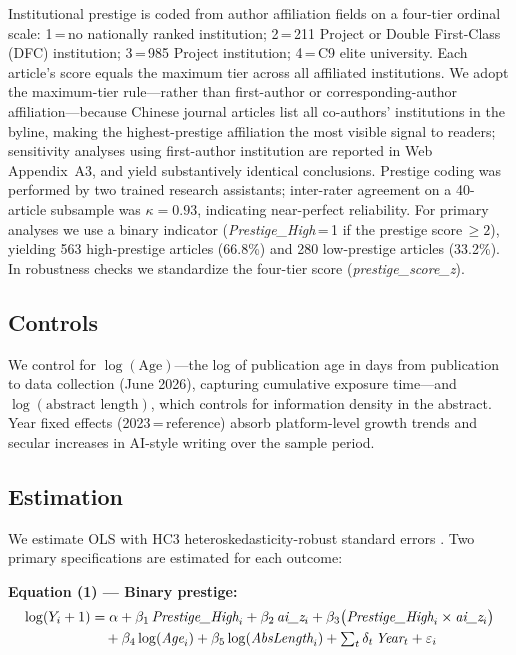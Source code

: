 \documentclass[12pt,a4paper]{article}
\begin{document}
Institutional prestige is coded from author affiliation fields on a
four-tier ordinal scale: 1\,=\,no nationally ranked institution;
2\,=\,211 Project or Double First-Class (DFC) institution;
3\,=\,985 Project institution; 4\,=\,C9 elite university.
Each article's score equals the maximum tier across all affiliated
institutions.
We adopt the maximum-tier rule---rather than first-author or
corresponding-author affiliation---because Chinese journal articles
list all co-authors' institutions in the byline, making the
highest-prestige affiliation the most visible signal to readers;
sensitivity analyses using first-author institution are reported in
Web Appendix~A3, and yield substantively identical conclusions.
Prestige coding was performed by two trained research assistants;
inter-rater agreement on a 40-article subsample was
$\kappa = 0.93$, indicating near-perfect reliability.
For primary analyses we use a binary indicator
(\textit{Prestige\_High}\,=\,1 if the prestige score\,$\geq 2$),
yielding 563 high-prestige articles (66.8\%) and 280 low-prestige
articles (33.2\%).
In robustness checks we standardize the four-tier score
(\textit{prestige\_score\_z}).

\subsection{Controls}

We control for $\log(\text{Age})$---the log of publication age in
days from publication to data collection (June 2026), capturing
cumulative exposure time---and $\log(\text{abstract length})$,
which controls for information density in the abstract.
Year fixed effects (2023\,=\,reference) absorb platform-level growth
trends and secular increases in AI-style writing over the sample period.

\subsection{Estimation}

We estimate OLS with HC3 heteroskedasticity-robust standard errors
\citep{MacKinnon1985}.
Two primary specifications are estimated for each outcome:

\noindent\textbf{Equation (1) --- Binary prestige:}
\begin{align}
\log(Y_i+1) &= \alpha
  + \beta_1\,\textit{Prestige\_High}_i
  + \beta_2\,\textit{ai\_z}_i
  + \beta_3\bigl(\textit{Prestige\_High}_i\times\textit{ai\_z}_i\bigr)
  \notag\\
  &\quad
  + \beta_4\log(\textit{Age}_i)
  + \beta_5\log(\textit{AbsLength}_i)
  + \textstyle\sum_{t}\delta_t\,\textit{Year}_t
  + \varepsilon_i
\label{eq:binary}
\end{align}
\end{document}
